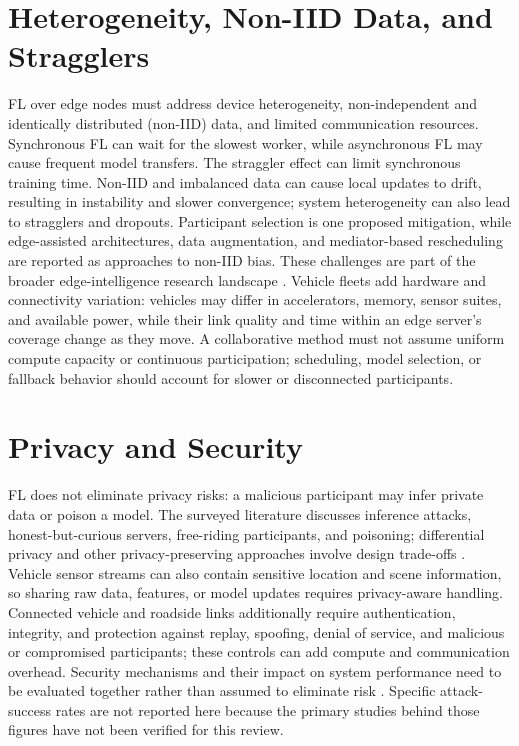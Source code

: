 \documentclass[12pt,a4paper,oneside]{report}
\begin{document}
\section{Heterogeneity, Non-IID Data, and Stragglers}

FL over edge nodes must address device heterogeneity, non-independent and
identically distributed (non-IID) data, and limited communication resources.
Synchronous FL can wait for the slowest worker, while asynchronous FL may
cause frequent model transfers. The straggler effect can limit
synchronous training time. Non-IID and imbalanced data can cause local
updates to drift, resulting in instability and slower convergence; system
heterogeneity can also lead to stragglers and dropouts. Participant
selection is one proposed mitigation, while edge-assisted architectures,
data augmentation, and mediator-based rescheduling are reported as approaches
to non-IID bias. These challenges are part of the broader edge-intelligence
research landscape \cite{deng2020}. Vehicle fleets add hardware and
connectivity variation: vehicles may differ in accelerators, memory, sensor
suites, and available power, while their link quality and time within an
edge server's coverage change as they move. A collaborative method must not
assume uniform compute capacity or continuous participation; scheduling,
model selection, or fallback behavior should account for slower or
disconnected participants.

\section{Privacy and Security}

FL does not eliminate privacy risks: a malicious participant may infer
private data or poison a model. The surveyed literature discusses inference
attacks, honest-but-curious servers, free-riding participants, and
poisoning; differential privacy and other privacy-preserving approaches
involve design trade-offs \cite{deng2020}. Vehicle sensor streams can also
contain sensitive location and scene information, so sharing raw data,
features, or model updates requires privacy-aware handling. Connected
vehicle and roadside links additionally require authentication, integrity,
and protection against replay, spoofing, denial of service, and malicious
or compromised participants; these controls can add compute and
communication overhead. Security mechanisms and their impact on system
performance need to be evaluated together rather than assumed to eliminate
risk \cite{biswas2023}. Specific attack-success rates
are not reported here because the primary studies behind those figures
have not been verified for this review.
\end{document}
